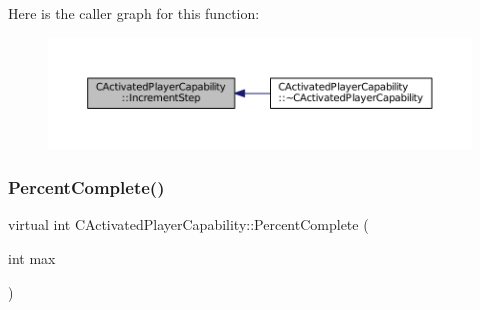 Here is the caller graph for this function\+:\nopagebreak
\begin{figure}[H]
\begin{center}
\leavevmode
\includegraphics[width=350pt]{classCActivatedPlayerCapability_a943b5999a57504399293250382c0ec6a_icgraph}
\end{center}
\end{figure}
\hypertarget{classCActivatedPlayerCapability_a405dc6076058006a4f801727de4cfe4d}{}\label{classCActivatedPlayerCapability_a405dc6076058006a4f801727de4cfe4d} 
\subsubsection{\texorpdfstring{Percent\+Complete()}{PercentComplete()}}
{\footnotesize\ttfamily virtual int C\+Activated\+Player\+Capability\+::\+Percent\+Complete (\begin{DoxyParamCaption}\item[{int}]{max }\end{DoxyParamCaption})\hspace{0.3cm}{\ttfamily [pure virtual]}}



